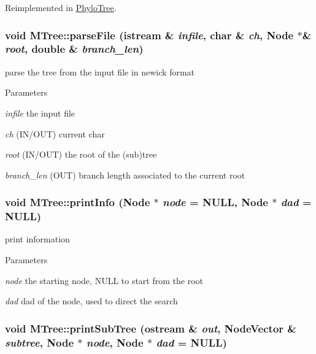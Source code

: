 Reimplemented in \hyperlink{classPhyloTree_a08daeabbb3fa596916aa48834e0b152d}{PhyloTree}.\hypertarget{classMTree_a6fa426401166681959012177d0e66f39}{
\subsubsection[{parseFile}]{\setlength{\rightskip}{0pt plus 5cm}void MTree::parseFile (istream \& {\em infile}, \/  char \& {\em ch}, \/  {\bf Node} $\ast$\& {\em root}, \/  double \& {\em branch\_\-len})}}
\label{classMTree_a6fa426401166681959012177d0e66f39}
parse the tree from the input file in newick format 
\begin{DoxyParams}{Parameters}
\item[{\em infile}]the input file \item[{\em ch}](IN/OUT) current char \item[{\em root}](IN/OUT) the root of the (sub)tree \item[{\em branch\_\-len}](OUT) branch length associated to the current root \end{DoxyParams}
\hypertarget{classMTree_ac186b9f3438e277d476f51803f2d3ce3}{
\subsubsection[{printInfo}]{\setlength{\rightskip}{0pt plus 5cm}void MTree::printInfo ({\bf Node} $\ast$ {\em node} = {\ttfamily NULL}, \/  {\bf Node} $\ast$ {\em dad} = {\ttfamily NULL})}}
\label{classMTree_ac186b9f3438e277d476f51803f2d3ce3}
print information 
\begin{DoxyParams}{Parameters}
\item[{\em node}]the starting node, NULL to start from the root \item[{\em dad}]dad of the node, used to direct the search \end{DoxyParams}
\hypertarget{classMTree_a898930e7052de462eac23705647762d8}{
\subsubsection[{printSubTree}]{\setlength{\rightskip}{0pt plus 5cm}void MTree::printSubTree (ostream \& {\em out}, \/  NodeVector \& {\em subtree}, \/  {\bf Node} $\ast$ {\em node}, \/  {\bf Node} $\ast$ {\em dad} = {\ttfamily NULL})}}
